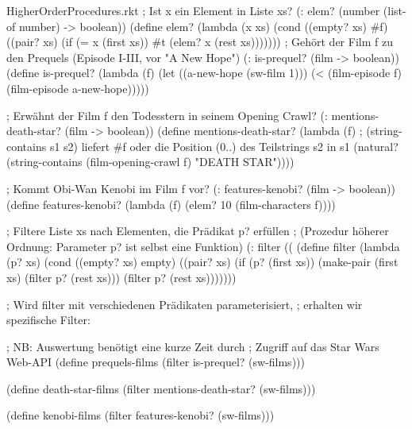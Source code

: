 \begin{filecontents*}{HigherOrderProcedures.rkt}
; Ist x ein Element in Liste xs?
(: elem? (number (list-of number) -> boolean))
(define elem?
  (lambda (x xs)
    (cond ((empty? xs) #f)
          ((pair? xs)
           (if (= x (first xs))
               #t
               (elem? x (rest xs)))))))
; Gehört der Film f zu den Prequels (Episode I-III, vor "A New Hope")
(: is-prequel? (film -> boolean))
(define is-prequel?
  (lambda (f)
    (let ((a-new-hope (sw-film 1)))
      (< (film-episode f)
         (film-episode a-new-hope)))))

; Erwähnt der Film f den Todesstern in seinem Opening Crawl?
(: mentions-death-star? (film -> boolean))
(define mentions-death-star?
  (lambda (f)
    ; (string-contains s1 s2) liefert #f oder die Position (0..) des Teilstrings s2 in s1
    (natural? (string-contains (film-opening-crawl f) "DEATH STAR"))))
    
; Kommt Obi-Wan Kenobi im Film f vor?
(: features-kenobi? (film -> boolean))
(define features-kenobi?
  (lambda (f)
    (elem? 10 (film-characters f))))



; Filtere Liste xs nach Elementen, die Prädikat p? erfüllen
; (Prozedur höherer Ordnung: Parameter p? ist selbst eine Funktion)
(: filter ((%
(define filter
  (lambda (p? xs)
    (cond ((empty? xs) empty)
          ((pair? xs)  (if (p? (first xs))
                           (make-pair (first xs)
                                      (filter p? (rest xs)))  
                           (filter p? (rest xs)))))))


; Wird filter mit verschiedenen Prädikaten parameterisiert,
; erhalten wir spezifische Filter:

; NB: Auswertung benötigt eine kurze Zeit durch 
;     Zugriff auf das Star Wars Web-API
(define prequels-films
  (filter is-prequel? (sw-films)))

(define death-star-films
  (filter mentions-death-star? (sw-films)))

(define kenobi-films
  (filter features-kenobi? (sw-films)))




\end{filecontents*}
